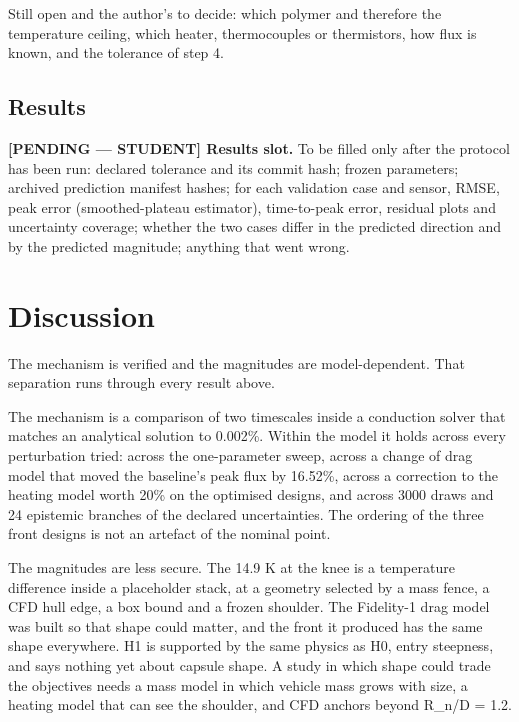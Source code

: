\documentclass[
  a4paper,
  11pt]{article}
\renewenvironment{quote}
  {\begin{tcolorbox}[enhanced, breakable, colback=white, colframe=white,
     borderline west={1.5pt}{0pt}{ruleline}, arc=0pt, boxrule=0pt, boxsep=0pt,
     left=10pt, right=0pt, top=3pt, bottom=3pt, before skip=6pt, after skip=8pt]}
  {\end{tcolorbox}}
\begin{document}
Still open and the author's to decide: which polymer and therefore the
temperature ceiling, which heater, thermocouples or thermistors, how
flux is known, and the tolerance of step 4.

\subsection{Results}

\begin{quote}
\textbf{{[}PENDING --- STUDENT{]} Results slot.} To be filled only after
the protocol has been run: declared tolerance and its commit hash;
frozen parameters; archived prediction manifest hashes; for each
validation case and sensor, RMSE, peak error (smoothed-plateau
estimator), time-to-peak error, residual plots and uncertainty coverage;
whether the two cases differ in the predicted direction and by the
predicted magnitude; anything that went wrong.
\end{quote}

\section{Discussion}

The mechanism is verified and the magnitudes are model-dependent. That
separation runs through every result above.

The mechanism is a comparison of two timescales inside a conduction
solver that matches an analytical solution to 0.002\%. Within the model
it holds across every perturbation tried: across the one-parameter
sweep, across a change of drag model that moved the baseline's peak flux
by 16.52\%, across a correction to the heating model worth 20\% on the
optimised designs, and across 3000 draws and 24 epistemic branches of
the declared uncertainties. The ordering of the three front designs is
not an artefact of the nominal point.

The magnitudes are less secure. The 14.9 K at the knee is a temperature
difference inside a placeholder stack, at a geometry selected by a mass
fence, a CFD hull edge, a box bound and a frozen shoulder. The
Fidelity-1 drag model was built so that shape could matter, and the
front it produced has the same shape everywhere. H1 is supported by the
same physics as H0, entry steepness, and says nothing yet about capsule
shape. A study in which shape could trade the objectives needs a mass
model in which vehicle mass grows with size, a heating model that can
see the shoulder, and CFD anchors beyond R\_n/D = 1.2.
\end{document}
